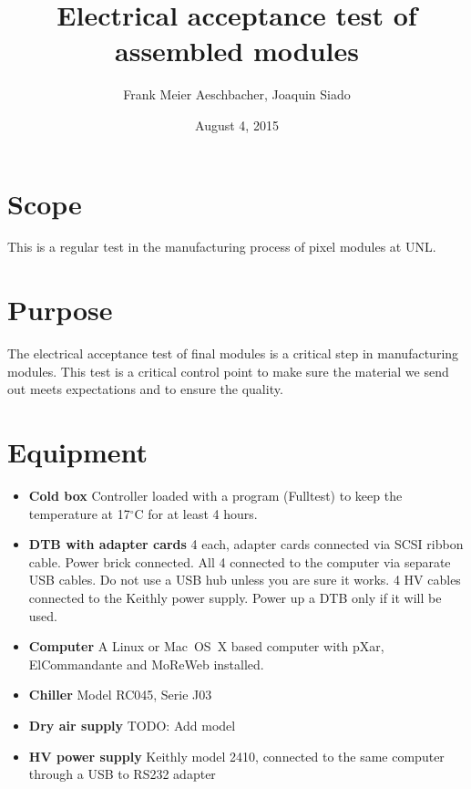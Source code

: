 \documentclass[12pt]{unlsilabsop}
\title{Electrical acceptance test of assembled modules}
\date{August 4, 2015}
\author{Frank Meier Aeschbacher, Joaquin Siado}
\begin{document}
\maketitle

\section{Scope}
This is a regular test in the manufacturing process of pixel modules at UNL.

\section{Purpose}
The electrical acceptance test of final modules is a critical step in manufacturing modules. This test is a critical control point to make sure the material we send out meets expectations and to ensure the quality.



\section{Equipment}

\begin{itemize}
\item \textbf{Cold box} Controller loaded with a program (Fulltest) to keep the temperature at 17$^\circ$C for at least 4 hours.
\item \textbf{DTB with adapter cards} 4 each, adapter cards connected via SCSI ribbon cable. Power brick connected. All 4 connected to the computer via separate USB cables. Do not use a USB hub unless you are sure it works. 4 HV cables connected to the Keithly power supply. Power up a DTB only if it will be used.
\item \textbf{Computer} A Linux or Mac~OS~X based computer with pXar, ElCommandante and MoReWeb installed.
\item \textbf{Chiller} Model RC045, Serie J03
\item \textbf{Dry air supply} TODO: Add model
\item \textbf{HV power supply} Keithly model 2410, connected to the same computer through a USB to RS232 adapter
\end{itemize}
\end{document}
